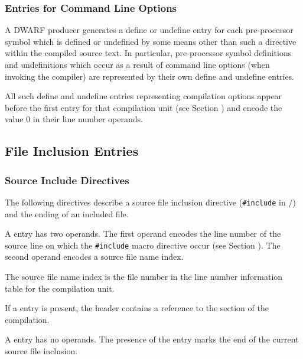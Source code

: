 \subsubsection{Entries for Command Line Options}
\label{chap:entriesforcommandlineoptions}
\DWMACROdefineINDX{}\DWMACROdefinestrpINDX{}\DWMACROdefinestrxINDX
\DWMACROundefINDX{}\DWMACROundefstrpINDX{}\DWMACROundefstrxINDX
A DWARF producer
generates a define or undefine entry for
each pre-processor symbol which is defined or undefined by
some means other than such a directive
within the compiled source text. In particular, pre-processor
symbol definitions and undefinitions which occur as a
result of command line options (when invoking the compiler)
are represented by their own define and
undefine entries.

All such define and undefine entries representing compilation 
options appear before the first \DWMACROstartfile{} 
entry for that compilation unit
(see Section )
and encode the value 0 in their line number operands.

\subsection{File Inclusion Entries}
\label{chap:fileinclusionentries}

\subsubsection{Source Include Directives}
\label{chap:sourceincludedirectives}

The following directives describe a source
file inclusion directive (\texttt{\#include} in
/) and the
ending of an included file.

\begin{enumerate}[1. ]

\itembfnl{\DWMACROstartfileTARG{}}
A \DWMACROstartfileNAME{} entry has two operands. The
first operand encodes the line number of the source line on
which the \texttt{\#include} macro directive occur
(see Section ).
The second operand encodes a source file name index. 

The source file name index is the file number in the 
line number information table for the compilation unit.

If a \DWMACROstartfileNAME{} entry is present, the header
contains a reference to the \dotdebugline{} section of 
the compilation.

\itembfnl{\DWMACROendfileTARG{}}
A \DWMACROendfileNAME{} entry has no operands. The presence of
the entry marks the end of the current source file inclusion.

\end{enumerate}

